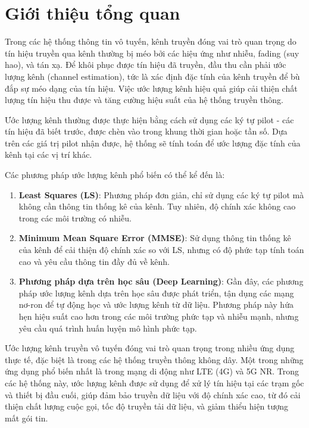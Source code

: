 \section{Giới thiệu tổng quan}

Trong các hệ thống thông tin vô tuyến, kênh truyền đóng vai trò quan trọng do tín hiệu truyền qua kênh thường bị méo bởi các hiệu ứng như nhiễu, fading (suy hao), và tán xạ. 
Để khôi phục được tín hiệu đã truyền, đầu thu cần phải ước lượng kênh (channel estimation), tức là xác định đặc tính của kênh truyền để bù đắp sự méo dạng của tín hiệu. 
Việc ước lượng kênh hiệu quả giúp cải thiện chất lượng tín hiệu thu được và tăng cường hiệu suất của hệ thống truyền thông.

Ước lượng kênh thường được thực hiện bằng cách sử dụng các ký tự pilot - các tín hiệu đã biết trước, 
được chèn vào trong khung thời gian hoặc tần số. 
Dựa trên các giá trị pilot nhận được, hệ thống sẽ tính toán để ước lượng đặc tính của kênh tại các vị trí khác.

Các phương pháp ước lượng kênh phổ biến có thể kể đến là:

\begin{enumerate}
    \item \textbf{Least Squares (LS)}: Phương pháp đơn giản, chỉ sử dụng các ký tự pilot mà không cần thông tin thống kê của kênh. Tuy nhiên, độ chính xác không cao trong các môi trường có nhiễu.

    \item \textbf{Minimum Mean Square Error (MMSE)}: Sử dụng thông tin thống kê của kênh để cải thiện độ chính xác so với LS, nhưng có độ phức tạp tính toán cao và yêu cầu thông tin đầy đủ về kênh.

    \item \textbf{Phương pháp dựa trên học sâu (Deep Learning)}: Gần đây, các phương pháp ước lượng kênh dựa trên học sâu được phát triển, tận dụng các mạng nơ-ron để tự động học và ước lượng kênh từ dữ liệu. 
    Phương pháp này hứa hẹn hiệu suất cao hơn trong các môi trường phức tạp và nhiễu mạnh, nhưng yêu cầu quá trình huấn luyện mô hình phức tạp.
\end{enumerate}

Ước lượng kênh truyền vô tuyến đóng vai trò quan trọng trong nhiều ứng dụng thực tế, đặc biệt là trong các hệ thống truyền thông không dây. Một trong những ứng dụng phổ biến nhất là trong mạng di động như LTE (4G) và 5G NR. Trong các hệ thống này, ước lượng kênh được sử dụng để xử lý tín hiệu tại các trạm gốc và thiết bị đầu cuối, giúp đảm bảo truyền dữ liệu với độ chính xác cao, từ đó cải thiện chất lượng cuộc gọi, tốc độ truyền tải dữ liệu, và giảm thiểu hiện tượng mất gói tin.

